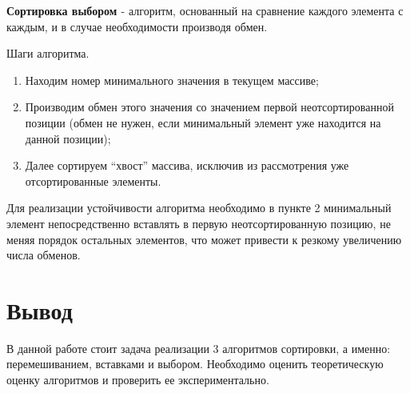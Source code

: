 \textbf{Сортировка выбором \cite{select}} - алгоритм, основанный на сравнение каждого элемента с каждым, и в случае необходимости производя обмен.

Шаги алгоритма.
\begin{enumerate}
	\item Находим номер минимального значения в текущем массиве;
	\item Производим обмен этого значения со значением первой неотсортированной позиции (обмен не нужен, если минимальный элемент уже находится на данной позиции);
	\item Далее сортируем ``хвост'' массива, исключив из рассмотрения уже отсортированные элементы.
\end{enumerate}

Для реализации устойчивости алгоритма необходимо в пункте 2 минимальный элемент непосредственно вставлять в первую неотсортированную позицию, не меняя порядок остальных элементов, что может привести к резкому увеличению числа обменов. 


\section*{Вывод}

В данной работе стоит задача реализации 3 алгоритмов сортировки, а
именно: перемешиванием, вставками и выбором. Необходимо оценить теоретическую оценку алгоритмов и проверить ее экспериментально.



